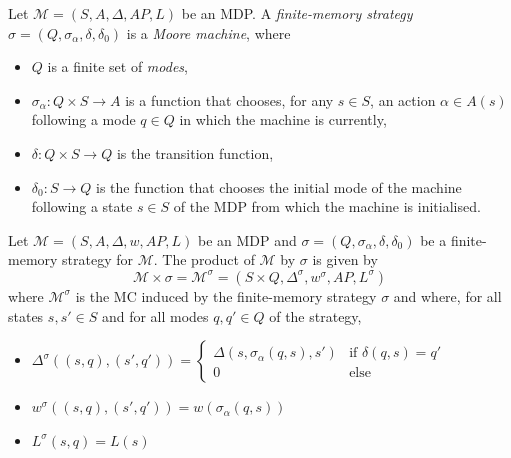 \begin{definition}
Let $\mathcal{M} = (S, A, \Delta, AP, L)$ be an MDP.
A \textit{finite-memory strategy} $\sigma = (Q, \sigma_\alpha, \delta, \delta_0)$ is a \textit{Moore machine}, where
\begin{itemize}
	\item $Q$ is a finite set of \textit{modes},
	\item $\sigma_\alpha: Q \times S \rightarrow A$ is a function that chooses, for any $s \in S$, an action $\alpha \in A(s)$ following a mode $q \in Q$ in which the machine is currently,
	\item $\delta: Q \times S \rightarrow Q$ is the transition function,
	\item $\delta_0: S \rightarrow Q$ is the function that chooses the initial mode of the machine following a state $s \in S$ of the MDP from which the machine is initialised.
\end{itemize}
\end{definition}

\begin{definition}
Let $\mathcal{M} = (S, A, \Delta, w, AP, L)$ be an MDP and $\sigma = (Q, \sigma_\alpha, \delta, \delta_0)$ be a finite-memory strategy for $\mathcal{M}$.
The product of $\mathcal{M}$ by $\sigma$ is given by
\[ \mathcal{M} \times \sigma = \mathcal{M}^\sigma = (S \times Q, \Delta^\sigma, w^\sigma, AP, L^\sigma) \]
where $\mathcal{M}^\sigma$ is the MC induced by the finite-memory strategy $\sigma$ and where,
for all states $s, s' \in S$ and for all modes $q, q' \in Q$ of the strategy,
\begin{itemize}
	\item $\Delta^\sigma((s, q), (s', q')) =
	\begin{cases}
	\Delta(s, \sigma_\alpha(q, s), s') & \text{if } \delta(q, s) = q'\\
	0  & \text{else}
	\end{cases}$
  \item $w^\sigma((s, q), (s', q')) = w(\sigma_\alpha(q, s))$
  \item $L^\sigma(s, q) = L(s)$
\end{itemize}
\end{definition}


